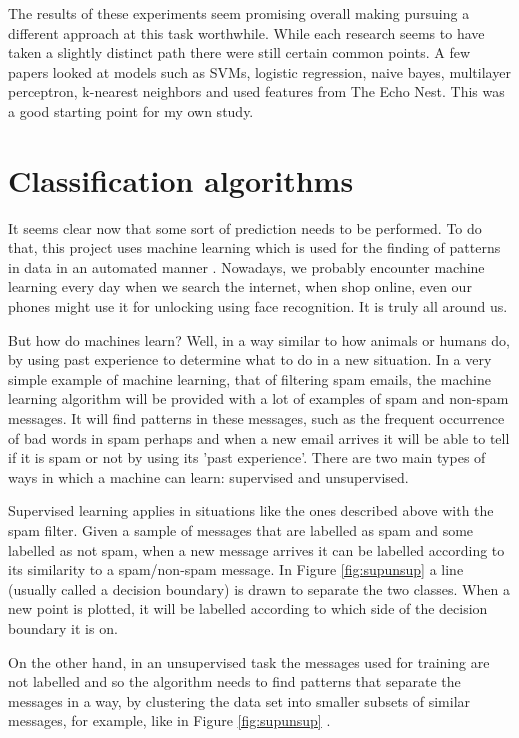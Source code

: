 The results of these experiments seem promising overall making pursuing a different approach at this task worthwhile. While each research seems to have taken a slightly distinct path there were still certain common points. A few papers looked at models such as SVMs, logistic regression, naive bayes, multilayer perceptron, k-nearest neighbors and used features from The Echo Nest. This was a good starting point for my own study.

\section{Classification algorithms}
It seems clear now that some sort of prediction needs to be performed. To do that, this project uses machine learning which is used for the finding of patterns in data in an automated manner \cite{shalev2014understanding}. Nowadays,  we probably encounter machine learning every day when we search the internet, when shop online, even our phones might use it for unlocking using face recognition. It is truly all around us. 

But how do machines learn? Well, in a way similar to how animals or humans do, by using past experience to determine what to do in a new situation. In a very simple example of machine learning, that of filtering spam emails, the machine learning algorithm will be provided with a lot of examples of spam and non-spam messages. It will find patterns in these messages, such as the frequent occurrence of bad words in spam perhaps and when a new email arrives it will be able to tell if it is spam or not by using its 'past experience'. There are two main types of ways in which a machine can learn: supervised and unsupervised. 

Supervised learning applies in situations like the ones described above with the spam filter. Given a sample of messages that are labelled as spam and some labelled as not spam, when a new message arrives it can be labelled according to its similarity to a spam/non-spam message. In Figure \ref{fig:supunsup} a line (usually called a decision boundary) is drawn to separate the two classes. When a new point is plotted, it will be labelled according to which side of the decision boundary it is on.

On the other hand, in an unsupervised task the messages used for training are not labelled and so the algorithm needs to find patterns that separate the messages in a way, by clustering the data set into smaller subsets of similar messages, for example, like in Figure \ref{fig:supunsup} \cite{shalev2014understanding}. 


